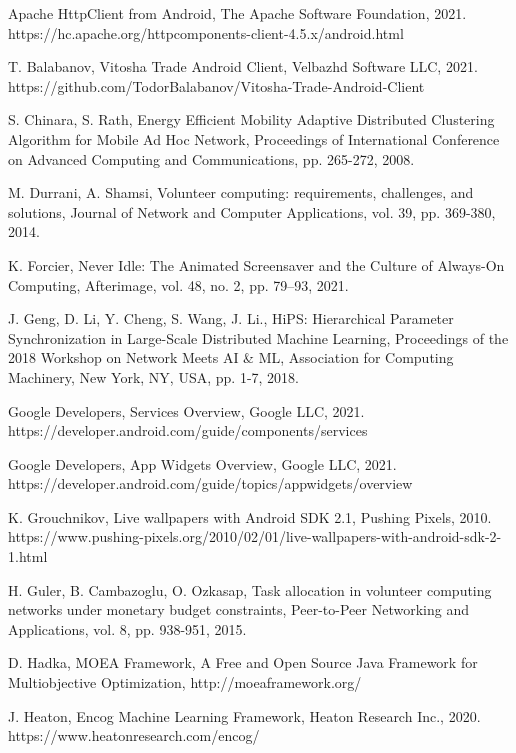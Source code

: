 \documentclass[a4paper,conference]{IEEEtran}
\begin{document}
\begin{thebibliography}{00}

 Apache HttpClient from Android, The Apache Software Foundation, 2021. https://hc.apache.org/httpcomponents-client-4.5.x/android.html

 T. Balabanov, Vitosha Trade Android Client, Velbazhd Software LLC, 2021. https://github.com/TodorBalabanov/Vitosha-Trade-Android-Client

 S. Chinara, S. Rath, Energy Efficient Mobility Adaptive Distributed Clustering Algorithm for Mobile Ad Hoc Network, Proceedings of International Conference on Advanced Computing and Communications, pp. 265-272, 2008.

 M. Durrani, A. Shamsi, Volunteer computing: requirements, challenges, and solutions, Journal of Network and Computer Applications, vol. 39, pp. 369-380, 2014.

 K. Forcier, Never Idle: The Animated Screensaver and the Culture of Always-On Computing, Afterimage, vol. 48, no. 2, pp. 79–93, 2021.

 J. Geng, D. Li, Y. Cheng, S. Wang, J. Li., HiPS: Hierarchical Parameter Synchronization in Large-Scale Distributed Machine Learning, Proceedings of the 2018 Workshop on Network Meets AI \& ML, Association for Computing Machinery, New York, NY, USA, pp. 1-7,  2018.

 Google Developers, Services Overview, Google LLC, 2021. https://developer.android.com/guide/components/services

 Google Developers, App Widgets Overview, Google LLC, 2021. https://developer.android.com/guide/topics/appwidgets/overview

 K. Grouchnikov, Live wallpapers with Android SDK 2.1, Pushing Pixels, 2010. https://www.pushing-pixels.org/2010/02/01/live-wallpapers-with-android-sdk-2-1.html

 H. Guler, B. Cambazoglu, O. Ozkasap, Task allocation in volunteer computing networks under monetary budget constraints, Peer-to-Peer Networking and Applications, vol. 8, pp. 938-951, 2015.

 D. Hadka, MOEA Framework, A Free and Open Source Java Framework for Multiobjective Optimization, http://moeaframework.org/

 J. Heaton, Encog Machine Learning Framework, Heaton Research Inc., 2020. https://www.heatonresearch.com/encog/


\end{thebibliography}
\end{document}
